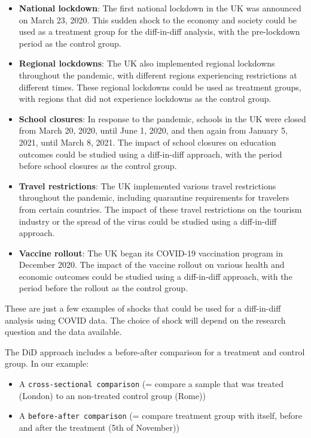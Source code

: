 \documentclass[
  letterpaper,
  DIV=11,
  numbers=noendperiod]{scrreprt}
\begin{document}
\begin{itemize}
\item
  \textbf{National lockdown}: The first national lockdown in the UK was
  announced on March 23, 2020. This sudden shock to the economy and
  society could be used as a treatment group for the diff-in-diff
  analysis, with the pre-lockdown period as the control group.
\item
  \textbf{Regional lockdowns}: The UK also implemented regional
  lockdowns throughout the pandemic, with different regions experiencing
  restrictions at different times. These regional lockdowns could be
  used as treatment groups, with regions that did not experience
  lockdowns as the control group.
\item
  \textbf{School closures}: In response to the pandemic, schools in the
  UK were closed from March 20, 2020, until June 1, 2020, and then again
  from January 5, 2021, until March 8, 2021. The impact of school
  closures on education outcomes could be studied using a diff-in-diff
  approach, with the period before school closures as the control group.
\item
  \textbf{Travel restrictions}: The UK implemented various travel
  restrictions throughout the pandemic, including quarantine
  requirements for travelers from certain countries. The impact of these
  travel restrictions on the tourism industry or the spread of the virus
  could be studied using a diff-in-diff approach.
\item
  \textbf{Vaccine rollout}: The UK began its COVID-19 vaccination
  program in December 2020. The impact of the vaccine rollout on various
  health and economic outcomes could be studied using a diff-in-diff
  approach, with the period before the rollout as the control group.
\end{itemize}

These are just a few examples of shocks that could be used for a
diff-in-diff analysis using COVID data. The choice of shock will depend
on the research question and the data available.

The DiD approach includes a before-after comparison for a treatment and
control group. In our example:

\begin{itemize}
\item
  A \texttt{cross-sectional\ comparison} (= compare a sample that was
  treated (London) to an non-treated control group (Rome))
\item
  A \texttt{before-after\ comparison} (= compare treatment group with
  itself, before and after the treatment (5th of November))
\end{itemize}
\end{document}
